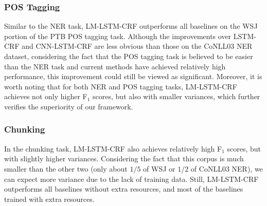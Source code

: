 \documentclass[letterpaper]{article} %
\newcommand{\our}{\textsc{LM-LSTM-CRF}\xspace}
\begin{document}
    \subsubsection{POS Tagging}
    Similar to the NER task, \our outperforms all baselines on the WSJ portion of the PTB POS tagging task. 
    Although the improvements over LSTM-CRF and CNN-LSTM-CRF are less obvious than those on the CoNLL03 NER dataset, considering the fact that the POS tagging task is believed to be easier than the NER task and current methods have achieved relatively high performance, this improvement could still be viewed as significant.
    Moreover, it is worth noting that for both NER and POS tagging tasks, \our achieves not only higher F$_1$ scores, but also with smaller variances, which further verifies the superiority of our framework.

    \subsubsection{Chunking}
    In the chunking task, \our also achieves relatively high F$_1$ scores, but with slightly higher variances.
    Considering the fact that this corpus is much smaller than the other two (only about $1/5$ of WSJ or $1/2$ of CoNLL03 NER), we can expect more variance due to the lack of training data.
    Still, \our outperforms all baselines without extra resources, and most of the baselines trained with extra resources.
\end{document}
